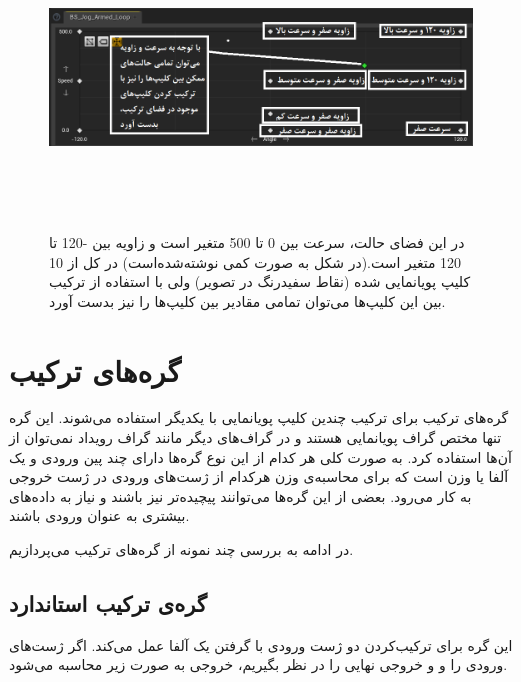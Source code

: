 \begin{figure}[ht]
	\centerline{\includegraphics[width=\textwidth,height=8cm,keepaspectratio]{Figures/Ch3/BlendSpace.png}}

	\caption{در این فضای حالت، سرعت بین 0 تا 500 متغیر است و زاویه بین -120 تا 120 متغیر است.(در شکل به صورت کمی نوشته‌شده‌است)
	در کل از 10 کلیپ پویانمایی شده (نقاط سفیدرنگ در تصویر) ولی با استفاده از ترکیب بین این کلیپ‌ها می‌توان تمامی مقادیر بین کلیپ‌ها را نیز بدست آورد. }
	\label{fig:BlendSpace}
\end{figure}


\section {گره‌های ترکیب}

گره‌های ترکیب برای ترکیب چندین کلیپ پویانمایی با یکدیگر استفاده‌ می‌شوند.
این گره‌ تنها مختص گراف پویانمایی هستند و در گراف‌های دیگر مانند گراف رویداد 
نمی‌توان از آن‌ها استفاده کرد.
به صورت کلی هر کدام از این نوع گره‌ها دارای چند پین ورودی و 
یک آلفا یا وزن است که برای محاسبه‌ی 
وزن هرکدام از ژست‌های ورودی در ژست خروجی به کار می‌رود.
بعضی از این گره‌‌ها می‌توانند 
پیچیده‌تر نیز باشند و نیاز به داده‌های بیشتری به عنوان ورودی باشند.

در ادامه به بررسی چند نمونه از گره‌‌های ترکیب می‌پردازیم.

\subsection{ گره‌ی ترکیب استاندارد}

این گره برای ترکیب‌کردن دو ژست ورودی با گرفتن یک آلفا عمل می‌کند.
اگر ژست‌های ورودی را
و 
 و
خروجی نهایی را 
در نظر بگیریم، 
خروجی به صورت زیر محاسبه می‌شود.

